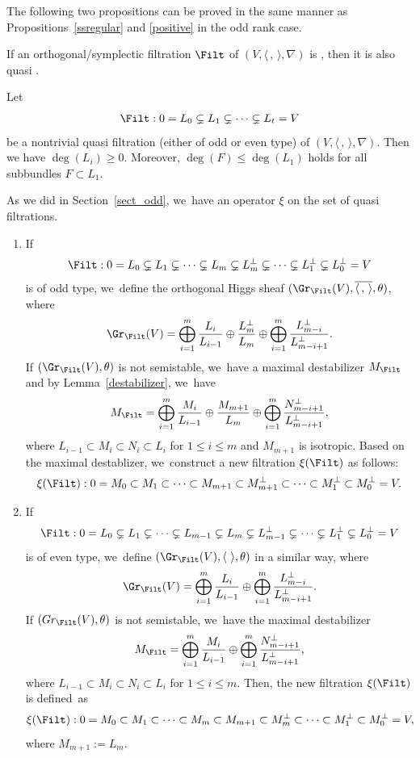 The following two propositions can be proved in the same manner as Propositions~\ref{ssregular} and \ref{positive} in the odd rank case.

\begin{prop}\label{prop_ssregular_even}
If an orthogonal/symplectic filtration $\Filt$ of $(V,\langle \,, \, \rangle,\nabla)$ is \grsemistable, then it is also quasi \grsemistable.
\end{prop}

\begin{prop}\label{positiveeven}
Let
\[
\Filt: 0= L_0 \subsetneq L_1 \subsetneq \cdots \subsetneq L_t = V
\]
be a nontrivial quasi \grsemistable filtration (either of odd or even type) of $(V,\langle \,, \, \rangle,\nabla)$. Then we have $\deg(L_i)\geq 0$. Moreover, $\deg(F)\leq \deg(L_1)$ holds for all subbundles $F\subset L_1$.
\end{prop}

As we did in Section~\ref{sect_odd}, we~have an operator $\xi$ on the set of quasi \grsemistable filtrations.
\begin{enumerate}
\item If
\[
\Filt: 0= L_0 \subsetneq L_1 \subsetneq \cdots \subsetneq L_m \subsetneq L_m^\perp\subsetneq\cdots \subsetneq L_1^\perp\subsetneq L_0^\perp= V
\]
is of odd type, we~define the orthogonal Higgs sheaf $(\Gr_{\Filt}(V), \overline{\langle \,, \, \rangle},\theta)$, where
\[
\Gr_{\Filt}(V)=\mathop{\bigoplus}_{i=1}^{m} \frac{L_i}{L_{i-1}}\oplus \frac{L_m^\perp}{L_m}\oplus \mathop{\bigoplus}_{i=1}^{m} \frac{L_{m-i}^\perp}{L_{m-i+1}^\perp}.
\]
If $(\Gr_{\Filt}(V),\theta)$ is not semistable, we~have a maximal destabilizer $M_{\Filt}$ and by Lem\-ma~\ref{destabilizer}, we~have
\[
M_{\Filt}=\mathop{\bigoplus}_{i=1}^{m} \frac{M_i}{L_{i-1}}\oplus \frac{M_{m+1}}{L_m}\oplus \mathop{\bigoplus}_{i=1}^{m} \frac{N_{m-i+1}^\perp}{L_{m-i+1}^\perp},
\]
where $L_{i-1}\subset M_i\subset N_i\subset L_i$ for $1\leq i\leq m$ and $M_{m+1}$ is isotropic. Based on the maximal destablizer, we~construct a new filtration $\xi(\Filt)$ as follows:
\[
\xi(\Filt):0=M_0\subset M_1\subset\cdots\subset M_{m+1}\subset M_{m+1}^\perp\subset\cdots\subset M_1^\perp\subset M_0^\perp=V.
\]

\item If
\[
\Filt: 0= L_0 \subsetneq L_1 \subsetneq \cdots\subsetneq L_{m-1} \subsetneq L_m \subsetneq L_{m-1}^\perp\subsetneq\cdots \subsetneq L_1^\perp\subsetneq L_0^\perp= V
\]
is of even type, we~define $(\Gr_{\Filt}(V),\langle \ \rangle,\theta)$ in a similar way, where
\[
\Gr_{\Filt}(V)=\mathop{\bigoplus}_{i=1}^{m} \frac{L_i}{L_{i-1}}\oplus \mathop{\bigoplus}_{i=1}^{m} \frac{L_{m-i}^\perp}{L_{m-i+1}^\perp}.
\]
If $(Gr_{\Filt}(V),\theta)$ is not semistable, we~have the maximal destabilizer
\[
M_{\Filt}=\mathop{\bigoplus}_{i=1}^{m} \frac{M_i}{L_{i-1}}\oplus \mathop{\bigoplus}_{i=1}^{m} \frac{N_{m-i+1}^\perp}{L_{m-i+1}^\perp},
\]
where $L_{i-1}\subset M_i\subset N_i\subset L_i$ for $1\leq i\leq m$. Then, the new filtration $\xi(\Filt)$ is defined~as
\[
\xi(\Filt):0=M_0\subset M_1\subset\cdots\subset M_m \subset M_{m+1}\subset M_m^\perp\subset\cdots\subset M_1^\perp\subset M_0^\perp=V,
\]
where $M_{m+1}:=L_m$.
\end{enumerate}

